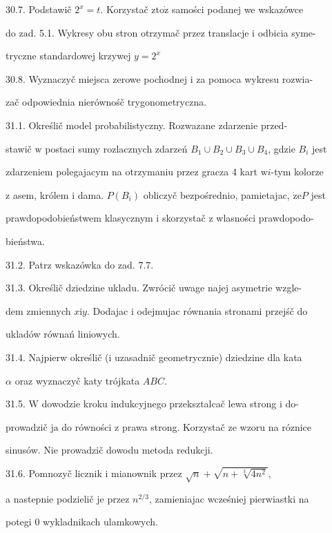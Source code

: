 \documentclass[a4paper,12pt]{article}
\begin{document}
30.7. Podstawič $2^{x}=t$. Korzystač $\mathrm{z}\mathrm{t}\mathrm{o}\dot{\mathrm{z}}$ samości podanej we wskazówce

do $\mathrm{z}\mathrm{a}\mathrm{d}$. 5.1. Wykresy obu stron otrzymač przez translacje $\mathrm{i}$ odbicia syme-

tryczne standardowej krzywej $y=2^{x}$

30.8. Wyznaczyč miejsca zerowe pochodnej $\mathrm{i}$ za pomoca wykresu rozwia-

zač odpowiednia nierównośč trygonometryczna.

31.1. Określič model probabilistyczny. Rozwazane zdarzenie przed-

stawič $\mathrm{w}$ postaci sumy rozlacznych zdarzeń $B_{1}\cup B_{2}\cup B_{3}\cup B_{4}$, gdzie $B_{i}$ jest

zdarzeniem polegajacym na otrzymaniu przez gracza 4 kart $\mathrm{w}i$-tym kolorze

$\mathrm{z}$ asem, królem $\mathrm{i}$ dama. $P(B_{i})$ obliczyč bezpośrednio, pamietajac, $\dot{\mathrm{z}}\mathrm{e}P$ jest

prawdopodobieństwem klasycznym $\mathrm{i}$ skorzystač $\mathrm{z}$ wlasności prawdopodo-

bieństwa.

31.2. Patrz wskazówka do zad. 7.7.

31.3. Określič dziedzine ukladu. Zwrócič uwage najej asymetrie wzgle-

dem zmiennych $x\mathrm{i}y$. Dodajac $\mathrm{i}$ odejmujac równania stronami przejśč do

ukladów równań liniowych.

31.4. Najpierw określič ($\mathrm{i}$ uzasadnič geometrycznie) dziedzine dla kata

$\alpha$ oraz wyznaczyč katy trójkata $ABC.$

31.5. $\mathrm{W}$ dowodzie kroku indukcyjnego przeksztalcač lewa strong $\mathrm{i}$ do-

prowadzič $\mathrm{j}\mathrm{a}$ do równości $\mathrm{z}$ prawa strong. Korzystač ze wzoru na róznice

sinusów. Nie prowadzič dowodu metoda redukcji.

31.6. Pomnozyč licznik $\mathrm{i}$ mianownik przez $\sqrt{n} + \sqrt{n+\sqrt[3]{4n^{2}}},$

a nastepnie podzielič je przez $n^{2/3}$, zamieniajac wcześniej pierwiastki na

potegi $0$ wykladnikach ulamkowych.
\end{document}
